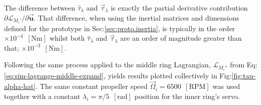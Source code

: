 \par
The difference between $\hat{\tau}_\lambda$ and $\vec{\tau}_\lambda$ is exactly the partial derivative contribution $\partial\mathcal{L}_{M_i'}/\partial\vec{\mathbf{u}}$. That difference, when using the inertial matrices and dimensions defined for the prototype in Sec:\ref{sec:proto.inertia}, is typically in the order $\times 10^{-4}~~[\text{Nm}]$ whilst both $\hat{\tau}_\lambda$ and $\vec{\tau}_\lambda$ are an order of magnitude greater than that; $\times 10^{-3}~~[\text{Nm}]$. 
\par
Following the same process applied to the middle ring Lagrangian, $\mathcal{L}_{M_i''}$ from Eq:\ref{eq:sim-lagrange-middle-expand}, yields results plotted collectively in Fig:\ref{fig:tau-alpha-hat}. The same constant propeller speed $\vec{\Omega}_i=6500~~[\text{RPM}]$ was used together with a constant $\lambda_i=\pi/5~~[\text{rad}]$ position for the inner ring's servo.
